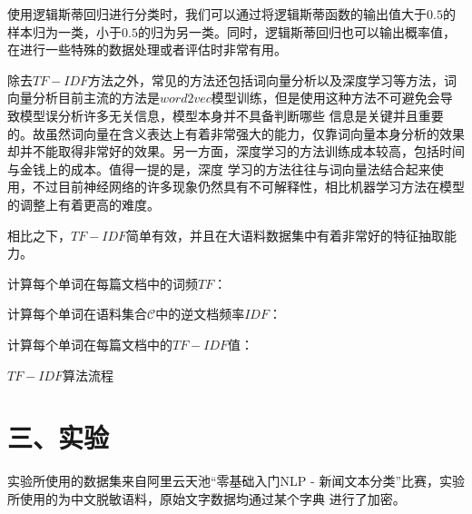 \documentclass{article}
\begin{document}
使用逻辑斯蒂回归进行分类时，我们可以通过将逻辑斯蒂函数的输出值大于$0.5$的样本归为一类，小于$0.5$的归为另一类。同时，逻辑斯蒂回归也可以输出概率值，在进行一些特殊的数据处理或者评估时非常有用。

除去$TF-IDF$方法之外，常见的方法还包括词向量分析以及深度学习等方法，词向量分析目前主流的方法是$word2vec$模型训练，但是使用这种方法不可避免会导致模型误分析许多无关信息，模型本身并不具备判断哪些
信息是关键并且重要的。故虽然词向量在含义表达上有着非常强大的能力，仅靠词向量本身分析的效果却并不能取得非常好的效果。另一方面，深度学习的方法训练成本较高，包括时间与金钱上的成本。值得一提的是，深度
学习的方法往往与词向量法结合起来使用，不过目前神经网络的许多现象仍然具有不可解释性，相比机器学习方法在模型的调整上有着更高的难度。

相比之下，$TF-IDF$简单有效，并且在大语料数据集中有着非常好的特征抽取能力。

\begin{algorithm}[H]
    \SetAlgoLined
    计算每个单词在每篇文档中的词频$TF$：\\
    
    计算每个单词在语料集合$\mathcal{C}$中的逆文档频率$IDF$：\\
    
    计算每个单词在每篇文档中的$TF-IDF$值：\\
    
    \caption{$TF-IDF$算法流程}
\end{algorithm}
\section*{\LARGE 三、实验}
实验所使用的数据集来自阿里云天池“零基础入门NLP - 新闻文本分类”比赛，实验所使用的为中文脱敏语料，原始文字数据均通过某个字典
进行了加密。
\end{document}
